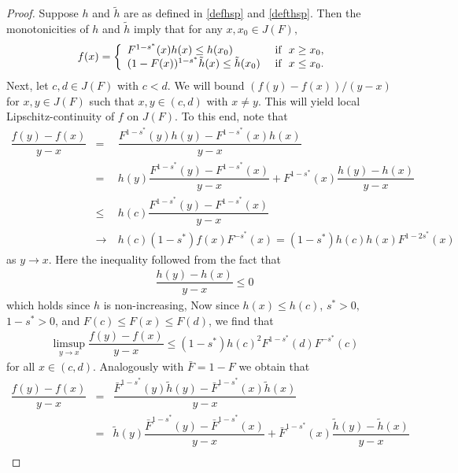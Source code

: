 \documentclass[11pt]{amsart}
\numberwithin{equation}{section}
\theoremstyle{definition}\newtheorem{definition}{Definition}
\theoremstyle{remark}\newtheorem{assumption}{Assumption}
\theoremstyle{remark}\newtheorem{remark}{Remark}
\theoremstyle{definition}\newtheorem{example}{Example}
\theoremstyle{plain}\newtheorem{question}{Question}
\theoremstyle{plain}\newtheorem{theorem}{Theorem}
\theoremstyle{plain}\newtheorem{lemma}{Lemma}
\theoremstyle{plain}\newtheorem{proposition}{Proposition}
\theoremstyle{plain}\newtheorem{corollary}{Corollary}
\theoremstyle{plain}\newtheorem{conjecture}{Conjecture}
\begin{document}
\begin{proof}
Suppose $h$ and $\tilde{h}$ are as defined in \eqref{defhsp} and \eqref{defthsp}. 
    Then the monotonicities of $h$ and $\tilde{h}$ imply that for any $x,x_0\in J(F),$
\begin{eqnarray*}
  f(x)= \left \{ \begin{array}{l l} %
      F^{1-s^*}(x)h(x)\leq h(x_0) &  \ \mbox{if} \ \  x\geq x_0,\\
      (1-F(x))^{1-s^*}\tilde{h}(x)\leq \tilde{h}(x_0) & \ \mbox{if} \ \  x\leq x_0.
      \end{array} \right .
\end{eqnarray*}
 Next, let $c,d \in J(F)$ with $c<d$. 
We will  bound $(f(y)-f(x))/(y-x)$ for $x,y\in J(F)$ such that $x,y\in(c,d)$ with $x \neq y$.
  This will yield local Lipschitz-continuity of $f$ on $J(F)$. 
  To this end, note that
\begin{eqnarray*}
 \dfrac{f(y)-f(x)}{y-x}
 & = & \ \dfrac{F^{1-s^*}(y)h(y)-F^{1-s^*}(x)h(x)}{y-x}\\
 & = & \  h(y)\dfrac{F^{1-s^*}(y)-F^{1-s^*}(x)}{y-x}+F^{1-s^*}(x)\dfrac{h(y)-h(x)}{y-x}\\
 & \leq & \  h(c)\dfrac{F^{1-s^*}(y)-F^{1-s^*}(x)}{y-x}\\
 & \to  & \  h(c) (1-s^*)f(x) F^{-s^*}(x)=(1-s^{*})h(c)h(x)F^{1-2s^{*}}(x)
\end{eqnarray*} 
as $y\to x$.  Here the inequality followed from the fact that 
\begin{eqnarray*}
\dfrac{h(y)-h(x)}{y-x}\leq 0
\end{eqnarray*} 
which holds since $h$ is non-increasing,
Now  since $h(x)\leq h(c)$, $s^*>0,$ $1- s^{*}>0$,  and $F(c)\leq F(x)\leq F(d)$, we find that
\begin{eqnarray}
\limsup_{y\to x}\dfrac{f(y)-f(x)}{y-x}\leq (1-s^*)h(c)^2F^{1-s^*}(d)F^{-s^*}(c)
\label{4eq1sp}
\end{eqnarray}
 for all $x\in(c,d)$.
Analogously with $\bar{F}=1-F$ we obtain that
\begin{eqnarray*}
\dfrac{f(y)-f(x)}{y-x}
& = & \dfrac{\bar{F}^{1-s^*}(y)\tilde{h}(y)-\bar{F}^{1-s^*}(x)\tilde{h}(x)}{y-x}\\
& = & \tilde{h}(y)\dfrac{\bar{F}^{1-s^*}(y)-\bar{F}^{1-s^*}(x)}{y-x}+\bar{F}^{1-s^*}(x)\dfrac{\tilde{h}(y)-\tilde{h}(x)}{y-x}\\

\end{eqnarray*}
\end{proof}
\end{document}
